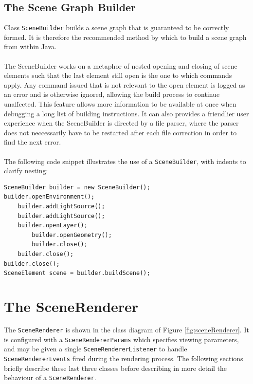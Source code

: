 \documentclass[10pt,aps, prb,preprint]{article}
\begin{document}
\subsection{The Scene Graph Builder}
Class \texttt{SceneBuilder} builds a scene graph that is guaranteed to be correctly formed. It is therefore the recommended method by which to build a scene graph from within Java. 
\\
\\
The SceneBuilder works on a metaphor of nested opening and closing of scene elements such that the last element still open is the one to which commands apply. Any command issued that is not relevant to the open element is logged as an error and is otherwise ignored, allowing the build process to continue unaffected. This feature allows more information to be available at once when debugging a long list of building instructions. It can also provides a friendlier user experience when the SceneBuilder is directed by a file parser, where the parser does not neccessarily have to be restarted after each file correction in order to find the next error.
\\
\\
The following code snippet illustrates the use of a \texttt{SceneBuilder}, with indents to clarify nesting:

\begin{verbatim}
SceneBuilder builder = new SceneBuilder();
builder.openEnvironment();
    builder.addLightSource();
    builder.addLightSource();
    builder.openLayer();
        builder.openGeometry();
        builder.close();
    builder.close();
builder.close();
SceneElement scene = builder.buildScene();
\end{verbatim} 


\newpage
\section{The SceneRenderer}
\label{SceneRenderer}
The \texttt{SceneRenderer} is shown in the class diagram of Figure \ref{fig:sceneRenderer}. It is configured with a \texttt{SceneRendererParams} which specifies viewing parameters, and may be given a single \texttt{SceneRendererListener} to handle \texttt{SceneRendererEvents} fired during the rendering process. The following sections briefly describe these last three classes before describing in more detail the behaviour of a \texttt{SceneRenderer}.
\end{document}
